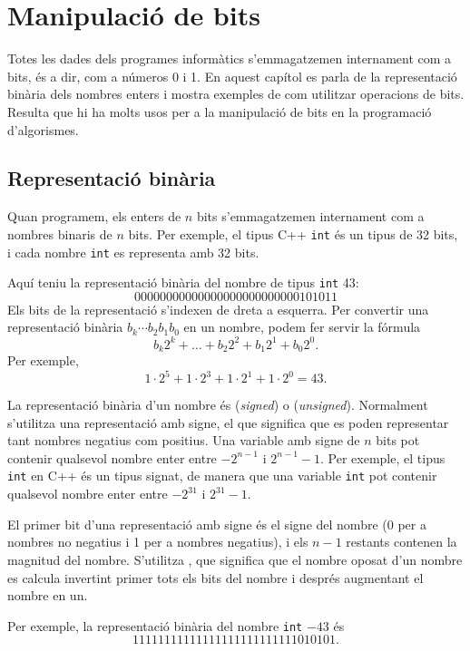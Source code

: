 \chapter{Manipulació de bits}

Totes les dades dels programes informàtics s'emmagatzemen internament
com a bits, és a dir, com a números 0 i 1. En aquest capítol es parla
de la representació binària dels nombres enters i mostra exemples de
com utilitzar operacions de bits. Resulta que hi ha molts usos per a
la manipulació de bits en la programació d'algorismes.

\section{Representació binària}


Quan programem, els enters de $n$ bits s'emmagatzemen internament com
a nombres binaris de $n$ bits. Per exemple, el tipus C++ \texttt{int}
és un tipus de 32 bits, i cada nombre \texttt{int} es representa amb
32 bits.

Aquí teniu la representació binària del nombre de tipus \texttt{int} 43:
\[00000000000000000000000000101011\]
Els bits de la representació s'indexen de dreta a esquerra. Per
convertir una representació binària $b_k \cdots b_2 b_1 b_0$ en un
nombre, podem fer servir la fórmula
\[b_k 2^k + \ldots + b_2 2^2 + b_1 2^1 + b_0 2^0.\]
Per exemple,
\[1 \cdot 2^5 + 1 \cdot 2^3 + 1 \cdot 2^1 + 1 \cdot 2^0 = 43.\]


La representació binària d'un nombre és 
(\emph{signed}) o  (\emph{unsigned}). Normalment
s'utilitza una representació amb signe, el que significa que es poden
representar tant nombres negatius com positius. Una variable amb signe
de $n$ bits pot contenir qualsevol nombre enter entre $-2^{n-1}$ i
$2^{n-1}-1$. Per exemple, el tipus \texttt{int} en C++ és un tipus
signat, de manera que una variable \texttt{int} pot contenir qualsevol
nombre enter entre $-2^{31}$ i $2^{31}-1$.

El primer bit d'una representació amb signe és el signe del nombre (0
per a nombres no negatius i 1 per a nombres negatius), i els $n-1$
restants contenen la magnitud del nombre. S'utilitza , que significa que el nombre oposat d'un nombre es calcula
invertint primer tots els bits del nombre i després augmentant el
nombre en un.

Per exemple, la representació binària del nombre \texttt{int} $-43$ és
\[11111111111111111111111111010101.\]


